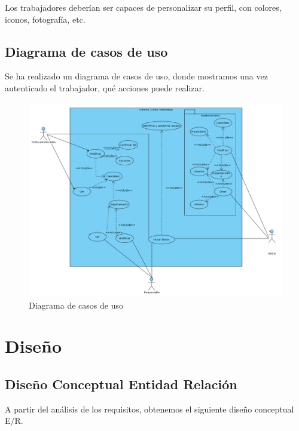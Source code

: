\documentclass[11pt,spanish,listoffigures,listoftables]{tfgetsinf}
\begin{document}
Los trabajadores deberían ser capaces de personalizar su perfil, con colores, iconos, fotografía, etc.

\section{Diagrama de casos de uso}

Se ha realizado un diagrama de casos de uso, donde mostramos una vez autenticado el trabajador, qué acciones puede realizar.

\begin{figure}[h!] %
   \includegraphics[width=\linewidth]{img/Casos de uso.png}
   \caption{Diagrama de casos de uso}
   \label{fig:CasosUso1}
 \end{figure}

\chapter{Diseño}

\section{Diseño Conceptual Entidad Relación}
A partir del análisis de los requisitos, obtenemos el siguiente diseño conceptual E/R.
\end{document}
